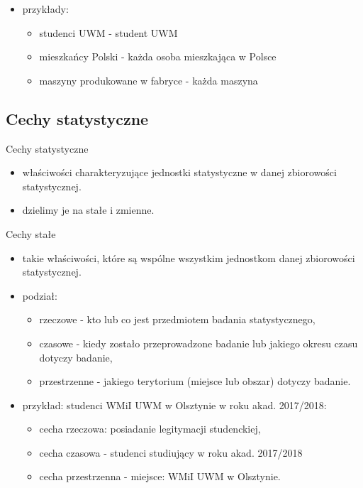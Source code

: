 \documentclass[
  letterpaper,
  DIV=11,
  numbers=noendperiod]{scrreprt}
\providecommand{\tightlist}{%
  \setlength{\itemsep}{0pt}\setlength{\parskip}{0pt}}\usepackage{longtable,booktabs,array}
\begin{document}
\begin{itemize}
\tightlist
\item
  przykłady:

  \begin{itemize}
  \tightlist
  \item
    studenci UWM - student UWM
  \item
    mieszkańcy Polski - każda osoba mieszkająca w Polsce
  \item
    maszyny produkowane w fabryce - każda maszyna
  \end{itemize}
\end{itemize}

\subsection{Cechy statystyczne}\label{cechy-statystyczne}

Cechy statystyczne

\begin{itemize}
\tightlist
\item
  właściwości charakteryzujące jednostki statystyczne w danej
  zbiorowości statystycznej.
\item
  dzielimy je na stałe i zmienne.
\end{itemize}

Cechy stałe

\begin{itemize}
\tightlist
\item
  takie właściwości, które są wspólne wszystkim jednostkom danej
  zbiorowości statystycznej.
\item
  podział:

  \begin{itemize}
  \tightlist
  \item
    rzeczowe - kto lub co jest przedmiotem badania statystycznego,
  \item
    czasowe - kiedy zostało przeprowadzone badanie lub jakiego okresu
    czasu dotyczy badanie,
  \item
    przestrzenne - jakiego terytorium (miejsce lub obszar) dotyczy
    badanie.
  \end{itemize}
\item
  przykład: studenci WMiI UWM w Olsztynie w roku akad. 2017/2018:

  \begin{itemize}
  \tightlist
  \item
    cecha rzeczowa: posiadanie legitymacji studenckiej,
  \item
    cecha czasowa - studenci studiujący w roku akad. 2017/2018
  \item
    cecha przestrzenna - miejsce: WMiI UWM w Olsztynie.
  \end{itemize}
\end{itemize}
\end{document}
